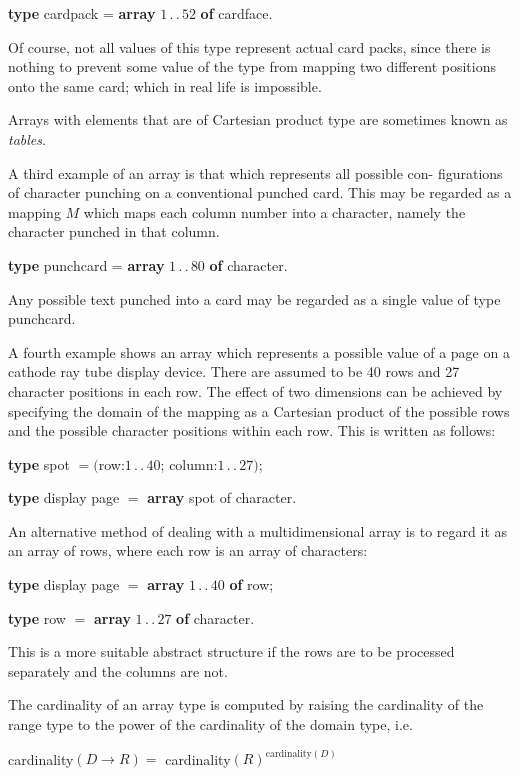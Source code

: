 \quad \textbf{type} cardpack = \textbf{array} $1\,.\,.\,52$ \textbf{of} cardface.

\noindent
Of course, not all values of this type represent actual card packs, since there is nothing to prevent some value of the type from mapping two different positions onto the same card; which in real life is impossible.

Arrays with elements that are of Cartesian product type are sometimes known as \textit{tables}.

A third example of an array is that which represents all possible con- figurations of character punching on a conventional punched card. This may be regarded as a mapping $M$ which maps each column number into a character, namely the character punched in that column.

\quad \textbf{type} punchcard = \textbf{array} $1\,.\,.\,80$ \textbf{of} character.

\noindent
Any possible text punched into a card may be regarded as a single value of type punchcard.

A fourth example shows an array which represents a possible value of a page on a cathode ray tube display device. There are assumed to be 40 rows and 27 character positions in each row. The effect of two dimensions can be achieved by specifying the domain of the mapping as a Cartesian product of the possible rows and the possible character positions within each row. This is written as follows:

\quad \textbf{type} spot $= ($row:$1\,.\,.\,40$; column:$1\,.\,.\,27)$;

\quad \textbf{type} display page $=$ \textbf{array} spot of character.

An alternative method of dealing with a multidimensional array is to regard it as an array of rows, where each row is an array of characters:

\quad \textbf{type} display page $=$ \textbf{array} $1\,.\,.\,40$ \textbf{of} row;

\quad \textbf{type} row $=$ \textbf{array} $1\,.\,.\,27$ \textbf{of} character.

\noindent
This is a more suitable abstract structure if the rows are to be processed separately and the columns are not.

The cardinality of an array type is computed by raising the cardinality of the range type to the power of the cardinality of the domain type, i.e.

\quad cardinality$(D \rightarrow R) =$ cardinality$(R)^{\text{cardinality}(D)}$

